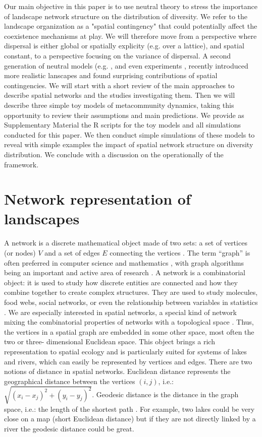 \documentclass[12pt]{article}
\begin{document}
Our main objective in this paper is to use neutral theory to stress the
importance of landscape network structure on the distribution of diversity. We
refer to the landscape organization as a "spatial contingency"
\parencite{Peres-Neto2013} that could potentially affect the coexistence
mechanisms at play. We will therefore move from a perspective where dispersal is
either global or spatially explicity (e.g. over a lattice), and spatial
constant, to a perspective focusing on the variance of dispersal. A second
generation of neutral models (e.g. \textcite{Economo2008,
Economo2011,Desjardins2012a,Desjardins2012b}, and even experiments
\parencite{Altermat2012}, recently introduced more realistic lanscapes and found
surprising contributions of spatial contingencies. We will start with a short
review of the main approaches to describe spatial networks and the studies
investigating them. Then we will describe three simple toy models of
metacommunity dynamics, taking this opportunity to review their assumptions and
main predictions. We provide as Supplementary Material the R scripts for the toy
models and all simulations conducted for this paper. We then conduct simple
simulations of these models to reveal with simple examples the impact of spatial
network structure on diversity distribution. We conclude with a discussion on
the operationally of the framework.

\section{Network representation of landscapes}

A network is a discrete mathematical object made of two sets: a set of
vertices (or nodes) $V$ and a set of edges $E$ connecting the vertices
\cite{new10}. The term ``graph'' is often preferred in computer science and
mathematics \cite{gro06}, with graph algorithms being an important and active
area of research \cite{sed01}. A network is a combinatorial object: it is
used to study how discrete entities are connected and how they combine
together to create complex structures. They are used to study molecules, food
webs, social networks, or even the relationship between variables in
statistics \cite{wri21,new10}. We are especially interested in spatial
networks, a special kind of network mixing the combinatorial properties of
networks with a topological space \cite{kob94}. Thus, the vertices in a
spatial graph are embedded in some other space, most often the two or three-
dimensional Euclidean space. This object brings a rich representation to
spatial ecology and is particularly suited for systems of lakes and rivers, which can
easily be represented by vertices and edges. There are two notions of
distance in spatial networks. Euclidean distance represents the geographical
distance between the vertices $(i, j)$, i.e.: $\sqrt{(x_i - x_j)^2 + (y_i - y_
j)^2}$. Geodesic distance is the distance in the graph space, i.e.: the
length of the shortest path \cite{dij59}. For example, two lakes could be
very close on a map (short Euclidean distance) but if they are not directly
linked by a river the geodesic distance could be great.
\end{document}
